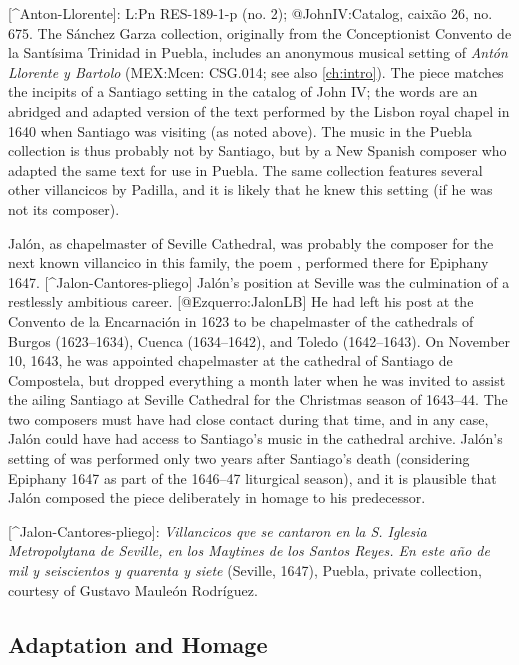 [^Anton-Llorente]:
L:Pn RES-189-1-p (no. 2); @JohnIV:Catalog, caixão 26, no. 675.
The Sánchez Garza collection, originally from the Conceptionist Convento de la
Santísima Trinidad in Puebla, includes an anonymous musical setting of \emph{Antón
Llorente y Bartolo} (MEX:Mcen: CSG.014; see also \cref{ch:intro}).
The piece matches the incipits of a Santiago setting in the catalog of John IV;
the words are an abridged and adapted version of the text performed by the
Lisbon royal chapel in 1640 when Santiago was visiting (as noted above).
The music in the Puebla collection is thus probably not by Santiago, but by a
New Spanish composer who adapted the same text for use in Puebla.
The same collection features several other villancicos by Padilla, and it is
likely that he knew this setting (if he was not its composer).



Jalón, as chapelmaster of Seville Cathedral, was probably the composer for the
next known villancico in this family, the poem ,
performed there for Epiphany 1647.
[^Jalon-Cantores-pliego]
Jalón's position at Seville was the culmination of a restlessly ambitious
career.
[@Ezquerro:JalonLB]
He had left his post at the Convento de la Encarnación in 1623 to be
chapelmaster of the cathedrals of Burgos (1623--1634), Cuenca (1634--1642), and
Toledo (1642--1643).
On November 10, 1643, he was appointed chapelmaster at the cathedral of Santiago
de Compostela, but dropped everything a month later when he was invited to
assist the ailing Santiago at Seville Cathedral for the Christmas season of
1643--44.
The two composers must have had close contact during that time, and in any case,
Jalón could have had access to Santiago's music in the cathedral archive.
Jalón's setting of  was performed only two years after Santiago's
death (considering Epiphany 1647 as part of the 1646--47 liturgical season), and
it is plausible that Jalón composed the piece deliberately in homage to his
predecessor.

[^Jalon-Cantores-pliego]:
\emph{Villancicos qve se cantaron en la S. Iglesia Metropolytana de Seville, en los
Maytines de los Santos Reyes.
En este año de mil y seiscientos y quarenta y siete} (Seville, 1647), Puebla,
private collection, courtesy of Gustavo Mauleón Rodríguez.

\subsection{Adaptation and Homage}

